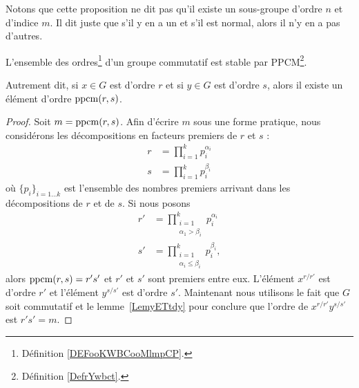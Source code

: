 \begin{normaltext}
    Notons que cette proposition ne dit pas qu'il existe un sous-groupe d'ordre \( n\) et d'indice \( m\). Il dit juste que s'il y en a un et s'il est normal, alors il n'y en a pas d'autres.
\end{normaltext}

\begin{lemma}       \label{LemqAUBYn}
    L'ensemble des ordres\footnote{Définition \ref{DEFooKWBCooMlmpCP}.} d'un groupe commutatif est stable par PPCM\footnote{Définition \ref{DefrYwbct}.}.

    Autrement dit, si \( x\in G\) est d'ordre \( r\) et si \( y\in G\) est d'ordre \( s\), alors il existe un élément d'ordre \( \operatorname{ppcm}(r,s)\).
\end{lemma}

\begin{proof}
    Soit \( m=\operatorname{ppcm}(r,s)\). Afin d'écrire \( m\) sous une forme pratique, nous considérons les décompositions en facteurs premiers de \( r\) et \( s\) :
    \begin{subequations}
        \begin{align}
            r&=\prod_{i=1}^kp_i^{\alpha_i}\\
            s&=\prod_{i=1}^kp_i^{\beta_i}
        \end{align}
    \end{subequations}
    où \( \{ p_i \}_{i=1\ldots k}\) est l'ensemble des nombres premiers arrivant dans les décompositions de \( r\) et de \( s\). Si nous posons
    \begin{subequations}
        \begin{align}
            r'&=\prod_{\substack{i=1\\\alpha_1>\beta_i}}^kp_i^{\alpha_i}\\
            s'&=\prod_{\substack{i=1\\\alpha_i\leq \beta_i}}^kp_i^{\beta_i},
        \end{align}
    \end{subequations}
    alors \( \operatorname{ppcm}(r,s)=r's'\) et \( r'\) et \( s'\) sont premiers entre eux. L'élément \( x^{r/r'}\) est d'ordre \( r'\) et l'élément \( y^{s/s'}\) est d'ordre \( s'\). Maintenant nous utilisons le fait que \( G\) soit commutatif et le lemme~\ref{LemyETtdy} pour conclure que l'ordre de \( x^{r/r'}y^{s/s'}\) est \( r's'=m\).
\end{proof}


